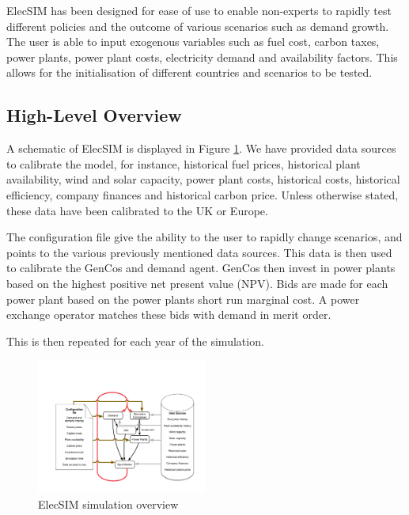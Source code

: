 
ElecSIM has been designed for ease of use to enable non-experts to rapidly test different policies and the outcome of various scenarios such as demand growth. The user is able to input exogenous variables such as fuel cost, carbon taxes, power plants, power plant costs, electricity demand and availability factors. This allows for the initialisation of different countries and scenarios to be tested.


\subsection{High-Level Overview}

A schematic of ElecSIM is displayed in Figure \ref{fig:system_overview}. We have provided data sources to calibrate the model, for instance, historical fuel prices, historical plant availability, wind and solar capacity, power plant costs, historical costs, historical efficiency, company finances and historical carbon price. Unless otherwise stated, these data have been calibrated to the UK or Europe.

The configuration file give the ability to the user to rapidly change scenarios, and points to the various previously mentioned data sources. This data is then used to calibrate the GenCos and demand agent. GenCos then invest in power plants based on the highest positive net present value (NPV). Bids are made for each power plant based on the power plants short run marginal cost. A power exchange operator matches these bids with demand in merit order. 

This is then repeated for each year of the simulation.


\begin{figure}[h]
	\begin{center}
		\includegraphics[width=0.5\textwidth]{figures/System_overview1.pdf}
		\caption{ElecSIM simulation overview}
		\label{fig:system_overview}
	\end{center}
\end{figure}

